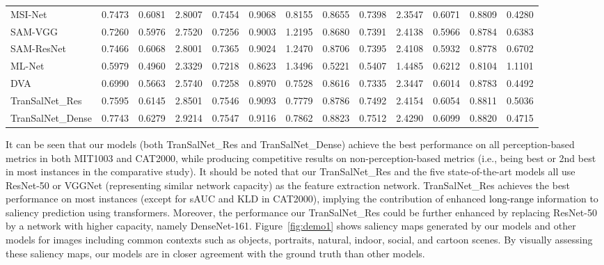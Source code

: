 \documentclass{article}
\begin{document}
\begin{table*}[]
{\begin{tabular}{l|cccccc|cccccc}
MSI-Net~\cite{MSI-Net} &0.7473&0.6081& \multicolumn{1}{c|}{2.8007} &0.7454&0.9068&0.8155&0.8655&0.7398& \multicolumn{1}{c|}{2.3547} &0.6071&0.8809&{\color{red}0.4280} \\
SAM-VGG~\cite{SAM_Cornia} &0.7260&0.5976& \multicolumn{1}{c|}{2.7520} &0.7256&  0.9003& 1.2195& 0.8680& 0.7391& \multicolumn{1}{c|}{2.4138} &0.5966& 0.8784&0.6383 \\
SAM-ResNet~\cite{SAM_Cornia}  &0.7466&0.6068& \multicolumn{1}{c|}{2.8001} &0.7365&0.9024& 1.2470&0.8706&0.7395& \multicolumn{1}{c|}{2.4108} &0.5932& 0.8778& 0.6702 \\
ML-Net~\cite{ML-Net}  &0.5979&0.4960& \multicolumn{1}{c|}{2.3329} &0.7218&0.8623&1.3496&0.5221& 0.5407& \multicolumn{1}{c|}{1.4485} &{\color{red}0.6212}&0.8104& 1.1101 \\
DVA~\cite{DVA_Wang} & 0.6990& 0.5663& \multicolumn{1}{c|}{2.5740} &0.7258&0.8970&{\color{red}0.7528}& 0.8616& 0.7335& \multicolumn{1}{c|}{2.3447} &0.6014 &0.8783& {\color{orange}0.4492} \\
\midrule
TranSalNet\_Res &{\color{orange}0.7595}&{\color{orange}0.6145}& \multicolumn{1}{c|}{{\color{orange}2.8501}} &{\color{orange}0.7546}&{\color{orange}0.9093}& {\color{orange}0.7779}& {\color{orange}0.8786}& {\color{orange}0.7492}& \multicolumn{1}{c|}{{\color{orange}2.4154}} &0.6054&{\color{orange}0.8811}& 0.5036\\ 
TranSalNet\_Dense & {\color{red}0.7743} & {\color{red}0.6279} & \multicolumn{1}{c|}{{\color{red}2.9214}} & {\color{red}0.7547} & {\color{red}0.9116} & 0.7862& {\color{red}0.8823}& {\color{red}0.7512} & \multicolumn{1}{c|}{{\color{red}2.4290}} &0.6099&{\color{red}0.8820}& 0.4715\\
\bottomrule
\end{tabular}\label{tb:perf_comp_mitcat}}
\end{table*}

It can be seen that our models (both TranSalNet\_Res and TranSalNet\_Dense) achieve the best performance on all perception-based metrics in both MIT1003 and CAT2000, while producing competitive results on non-perception-based metrics (i.e., being best or 2nd best in most instances in the comparative study). It should be noted that our TranSalNet\_Res and the five state-of-the-art models all use ResNet-50 or VGGNet (representing similar network capacity) as the feature extraction network. TranSalNet\_Res achieves the best performance on most instances (except for sAUC and KLD in CAT2000), implying the contribution of enhanced \textcolor{black}{long-range} information to saliency prediction using transformers. Moreover, the performance our TranSalNet\_Res could be further enhanced by replacing ResNet-50 by a network with higher capacity, namely DenseNet-161.
Figure~\ref{fig:demo1} shows saliency maps generated by our models and other models for images including common contexts such as objects, portraits, natural, indoor, social, and cartoon scenes. By visually assessing these saliency maps, our models are in closer agreement with the ground truth than other models. 
\end{document}
